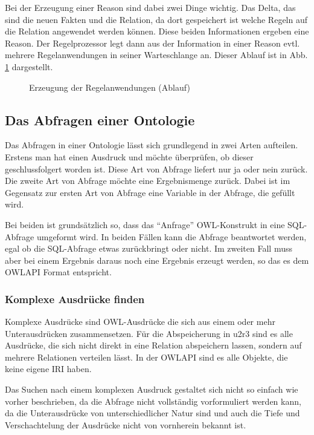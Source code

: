 Bei der Erzeugung einer Reason sind dabei zwei Dinge wichtig. Das Delta, das sind die neuen Fakten und die Relation, da dort gespeichert ist welche Regeln auf die Relation angewendet werden können. Diese beiden Informationen ergeben eine Reason. Der Regelprozessor legt dann aus der Information in einer Reason evtl. mehrere Regelanwendungen in seiner Warteschlange an. Dieser Ablauf ist in Abb. \ref{diagram-ruleexecution2} dargestellt.

\begin{figure}[htp]
\begin{center}
  \caption{Erzeugung der Regelanwendungen (Ablauf)}
  \label{diagram-ruleexecution2}
\end{center}
\end{figure}

\subsection{Das Abfragen einer Ontologie}
Das Abfragen in einer Ontologie lässt sich grundlegend in zwei Arten aufteilen. Erstens man hat einen Ausdruck und möchte überprüfen, ob dieser geschlussfolgert worden ist. Diese Art von Abfrage liefert nur ja oder nein zurück. Die zweite Art von Abfrage möchte eine Ergebnismenge zurück. Dabei ist im Gegensatz zur ersten Art von Abfrage eine Variable in der Abfrage, die gefüllt wird.

Bei beiden ist grundsätzlich so, dass das ``Anfrage'' OWL-Konstrukt in eine SQL-Abfrage umgeformt wird. In beiden Fällen kann die Abfrage beantwortet werden, egal ob die SQL-Abfrage etwas zurückbringt oder nicht. Im zweiten Fall muss aber bei einem Ergebnis daraus noch eine Ergebnis erzeugt werden, so das es dem OWLAPI Format entspricht.

\subsubsection{Komplexe Ausdrücke finden}

Komplexe Ausdrücke sind OWL-Ausdrücke die sich aus einem oder mehr Unterausdrücken zusammensetzen. Für die Abspeicherung in u2r3 sind es alle Ausdrücke, die sich nicht direkt in eine Relation abspeichern lassen, sondern auf mehrere Relationen verteilen lässt. In der OWLAPI sind es alle Objekte, die keine eigene IRI haben.

Das Suchen nach einem komplexen Ausdruck gestaltet sich nicht so einfach wie vorher beschrieben, da die Abfrage nicht vollständig vorformuliert werden kann, da die Unterausdrücke von unterschiedlicher Natur sind und auch die Tiefe und Verschachtelung der Ausdrücke nicht von vornherein bekannt ist.

